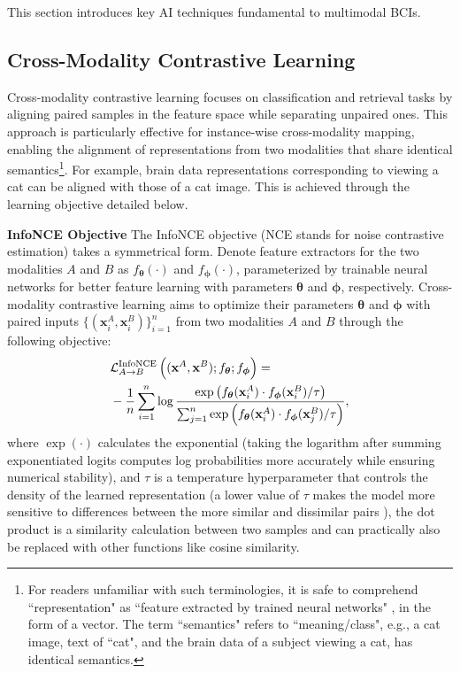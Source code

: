 \documentclass[journal]{IEEEtran}
\begin{document}
This section introduces key AI techniques fundamental to multimodal BCIs.

\subsection{Cross-Modality Contrastive Learning} \label{sect:contrastive}

Cross-modality contrastive learning focuses on classification and retrieval tasks by aligning paired samples in the feature space while separating unpaired ones. This approach is particularly effective for instance-wise cross-modality mapping, enabling the alignment of representations from two modalities that share identical semantics\footnote{For readers unfamiliar with such terminologies, it is safe to comprehend ``representation" as ``feature extracted by trained neural networks" \cite{Bengio2013}, in the form of a vector. The term ``semantics" refers to ``meaning/class", e.g., a cat image, text of ``cat", and the brain data of a subject viewing a cat, has identical semantics.}. For example, brain data representations corresponding to viewing a cat can be aligned with those of a cat image. This is achieved through the learning objective detailed below.

\textbf{InfoNCE Objective} The InfoNCE objective \cite{Oord2018CPC, Radford2021} (NCE stands for noise contrastive estimation) takes a symmetrical form. Denote feature extractors for the two modalities $A$ and $B$ as $f_{\boldsymbol{\theta}}(\cdot)$ and $f_{\boldsymbol{\phi}}(\cdot)$, parameterized by trainable neural networks for better feature learning with parameters $\boldsymbol{\theta}$ and $\boldsymbol{\phi}$, respectively. Cross-modality contrastive learning aims to optimize their parameters $\boldsymbol{\theta}$ and $\boldsymbol{\phi}$ with paired inputs $\{(\mathbf{x}_{i}^{A}, \mathbf{x}_{i}^{B})\}_{i=1}^{n}$ from two modalities $A$ and $B$ through the following objective:
\begin{align}
& \mathcal{L}_{A \rightarrow B}^{\text{InfoNCE}} \left((\mathbf{x}^{A}, \mathbf{x}^{B}); f_{\boldsymbol{\theta}}; f_{\boldsymbol{\phi}} \right) = \nonumber \\ & \hfill - \frac{1}{n} \sum_{i=1}^{n} \log \frac{\exp \left(f_{\boldsymbol{\theta}}(\mathbf{x}_{i}^{A}) \cdot f_{\boldsymbol{\phi}}(\mathbf{x}_{i}^{B}) / \tau \right)}{\sum_{j=1}^{n} \exp  \left(f_{\boldsymbol{\theta}}(\mathbf{x}_{i}^{A}) \cdot f_{\boldsymbol{\phi}}(\mathbf{x}_{j}^{B}) / \tau \right)},
\label{eq:infonce-oneside}
\end{align}
where $\exp(\cdot)$ calculates the exponential (taking the logarithm after summing exponentiated logits computes log probabilities more accurately while ensuring numerical stability), and $\tau$ is a temperature hyperparameter that controls the density of the learned representation (a lower value of $\tau$ makes the model more sensitive to differences between the more similar and dissimilar pairs \cite{Wang2021}), the dot product is a similarity calculation between two samples and can practically also be replaced with other functions like cosine similarity.
\end{document}
